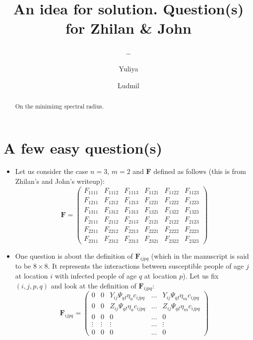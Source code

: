 \documentclass[12pt]{amsart}
\title{An idea for solution. Question(s) for Zhilan \& John}
\author{\ldots \and Yuliya \and Ludmil}
\theoremstyle{definition}
\begin{document}
\maketitle

\begin{abstract}
On the minimizng spectral radius. 
\end{abstract}

\section{A few easy question(s)}
\begin{itemize}
\item Let us consider the case $n=3$, $m=2$ and  $\bm F$ defined as follows (this is from Zhilan's and John's  writeup):
\begin{equation}
\bm F = \begin{pmatrix}
F_{1111} & F_{1112} & F_{1113} &  F_{1121} &  F_{1122} & F_{1123} \\
F_{1211} & F_{1212} & F_{1213} & F_{1221} &  F_{1222} & F_{1223} \\
F_{1311} & F_{1312} & F_{1313} & F_{1321} &  F_{1322} & F_{1323} \\
F_{2111} & F_{2112} & F_{2113} & F_{2121} &  F_{2122} & F_{2123} \\
F_{2211} & F_{2212} & F_{2213} & F_{2221} &  F_{2222} & F_{2223} \\
F_{2311} & F_{2312} & F_{2313} & F_{2321} &  F_{2322} & F_{2323}
\end{pmatrix}
\end{equation}
\item One question is about the definition of $\bm F_{ijpq}$ (which in the manuscript is said to be $8\times 8$. {\color{red} It represents the interactions between susceptible people of age $j$ at location $i$ with infected people of age $q$ at location $p$}). 
Let us fix $(i,j,p,q)$ and look at the definition of $\bm F_{ijpq}$:
\begin{equation}\label{f-ijpq-1}
\bm{F}_{ijpq}=
\begin{pmatrix}
0 & 0 &  Y_{ij}\Psi_{qI}\eta_{a}c_{ijpq} & \ldots & Y_{ij}\Psi_{qI}\eta_{m}c_{ijpq}\\
0 & 0 &  Z_{ij}\Psi_{qI}\eta_{a}c_{ijpq} & \ldots & Z_{ij}\Psi_{qI}\eta_{m}c_{ijpq}\\
0 & 0 &  0 & \ldots & 0\\
\vdots & \vdots &  \vdots & \ldots & \vdots\\
0 & 0 &  0 & \ldots & 0
\end{pmatrix}
\end{equation}
\end{itemize}
\end{document}
